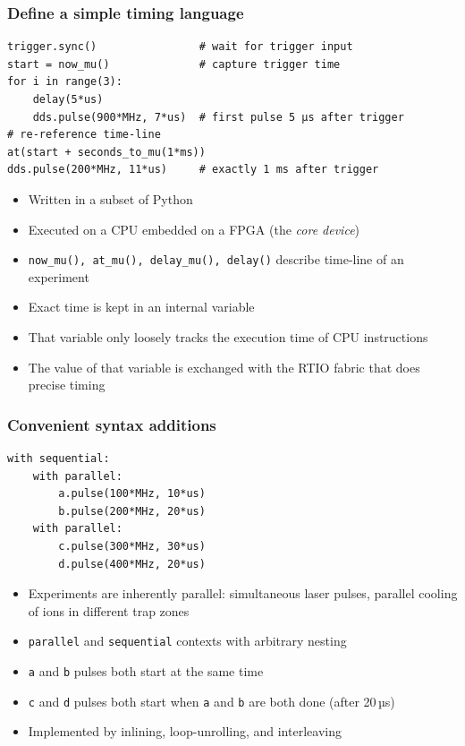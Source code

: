 \documentclass[final,presentation,compress]{beamer}
\begin{document}
\begin{frame}[fragile]
  \frametitle{Define a simple timing language}
  \footnotesize

  \begin{verbatim}
trigger.sync()                # wait for trigger input
start = now_mu()              # capture trigger time
for i in range(3):
    delay(5*us)
    dds.pulse(900*MHz, 7*us)  # first pulse 5 µs after trigger
# re-reference time-line
at(start + seconds_to_mu(1*ms))
dds.pulse(200*MHz, 11*us)     # exactly 1 ms after trigger
  \end{verbatim}

  \begin{itemize}
    \item Written in a subset of Python
    \item Executed on a CPU embedded on a FPGA (the \emph{core device})
    \item \verb!now_mu(), at_mu(), delay_mu(), delay()! describe time-line of an experiment
    \item Exact time is kept in an internal variable
    \item That variable only loosely tracks the execution time of CPU instructions
    \item The value of that variable is exchanged with the RTIO fabric that
      does precise timing
  \end{itemize}
\end{frame}


\begin{frame}[fragile]
  \frametitle{Convenient syntax additions}
  \footnotesize
  \begin{verbatim}
with sequential:
    with parallel:
        a.pulse(100*MHz, 10*us)
        b.pulse(200*MHz, 20*us)
    with parallel:
        c.pulse(300*MHz, 30*us)
        d.pulse(400*MHz, 20*us)
  \end{verbatim}

  \begin{itemize}
    \item Experiments are inherently parallel:
        simultaneous laser pulses, parallel cooling of ions in different trap zones
    \item \verb!parallel! and \verb!sequential! contexts with arbitrary nesting
    \item \verb!a! and \verb!b! pulses both start at the same time
    \item \verb!c! and \verb!d! pulses both start when \verb!a! and \verb!b! are both done
      (after 20\,µs)
    \item Implemented by inlining, loop-unrolling, and interleaving
  \end{itemize}
\end{frame}
\end{document}
